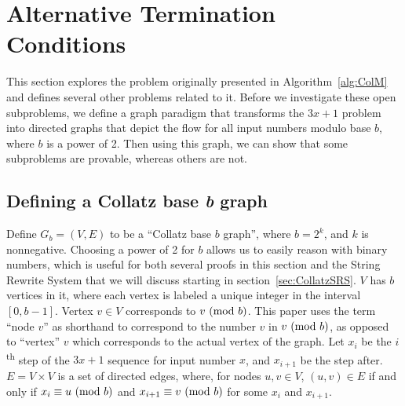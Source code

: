 \chapter{Alternative Termination Conditions} \label{sec:alttercdns}
 This section explores the problem originally presented in Algorithm~\ref{alg:ColM} and defines several other problems related to it. Before we investigate these open subproblems, we define a graph paradigm that transforms the $3x+1$ problem into directed graphs that depict the flow for all input numbers modulo base $b$, where $b$ is a power of 2. Then using this graph, we can show that some subproblems are provable, whereas others are not.
\section{Defining a Collatz base \textit{b} graph} \label{subsec:colgraph}
Define $G_b=(V,E)$ to be a ``Collatz base $b$ graph'', where $b = 2^k$, and $k$ is nonnegative. Choosing a power of 2 for $b$ allows us to easily reason with binary numbers, which is useful for both several proofs in this section and the String Rewrite System that we will discuss starting in section~\ref{sec:CollatzSRS}. $V$ has $b$ vertices in it, where each vertex is labeled a unique integer in the interval $[0, b-1]$. Vertex $v \in V$ corresponds to $v \ (\mathrm{mod}\ b)$. This paper uses the term ``node $v$'' as shorthand to correspond to the number $v$ in $v \ (\mathrm{mod}\ b)$, as opposed to ``vertex'' $v$ which corresponds to the actual vertex of the graph. Let $x_i$ be the $i$\textsuperscript{th} step of the $3x+1$ sequence for input number $x$, and $x_{i+1}$ be the step after. $E = V \times V$ is a set of directed edges, where, for nodes $u, v \in V$, $(u,v) \in E$ if and only if $x_i \equiv u \ (\mathrm{mod}\ b)$ and $x_{i+1} \equiv v \ (\mathrm{mod}\ b)$ for some $x_i$ and $x_{i+1}$. \par


